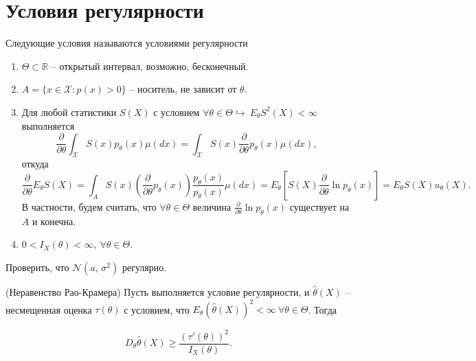 \section{Условия регулярности}
\begin{definition}
Следующие условия называются условиями регулярности
\end{definition}
\begin{enumerate}
\item $\displaystyle \Theta \subset \mathbb{R}$ -- открытый интервал, возможно, бесконечный.
\item $\displaystyle A=\{x\in \mathcal{X} :p( x)  >0\}$ -- носитель, не зависит от $\displaystyle \theta $.
\item Для любой статистики $\displaystyle S( X)$ с условием $\displaystyle \forall \theta \in \Theta \hookrightarrow \ E_{\theta } S^{2}( X) < \infty $ выполняется
\begin{equation*}
\frac{\partial }{\partial \theta }\int _{\mathcal{X}} S( x) p_{\theta }( x) \mu ( dx) =\int _{\mathcal{X}} S( x)\frac{\partial }{\partial \theta } p_{\theta }( x) \mu ( dx),
\end{equation*}
откуда
\begin{equation*}
\frac{\partial }{\partial \theta } E_{\theta } S( X) =\int _{A} S( x)\left(\frac{\partial }{\partial \theta } p_{\theta }( x)\right)\frac{p_{\theta }( x)}{p_{\theta }( x)} \mu ( dx) =E_{\theta }\left[ S( X)\frac{\partial }{\partial \theta }\ln p_{\theta }( x)\right] =E_{\theta } S( X) u_{\theta }( X) .
\end{equation*}
В частности, будем считать, что $\displaystyle \forall \theta \in \Theta$ величина $\displaystyle \frac{\partial }{\partial \theta }\ln p_{\theta }( x)$ существует на $\displaystyle A$ и конечна.
\item $\displaystyle 0< I_{X}( \theta ) < \infty, \ \forall \theta \in \Theta $.
\end{enumerate}
\begin{exercise}
Проверить, что $\displaystyle \mathcal{N}\left(a,\, \sigma ^{2}\right)$ регулярно.
\end{exercise}
\begin{theorem}
(Неравенство Рао-Крамера) Пусть выполняется условие регулярности, и $\displaystyle \hat{\theta }( X)$ -- несмещенная оценка $\displaystyle \tau ( \theta )$ с условием, что $\displaystyle E_{\theta }(\hat{\theta }( X))^{2} < \infty \ \forall \theta \in \Theta $. Тогда


\begin{equation*}
D_{\theta }\hat{\theta }( X) \geqslant \frac{( \tau '( \theta ))^{2}}{I_{X}( \theta )} .
\end{equation*}
\end{theorem}
